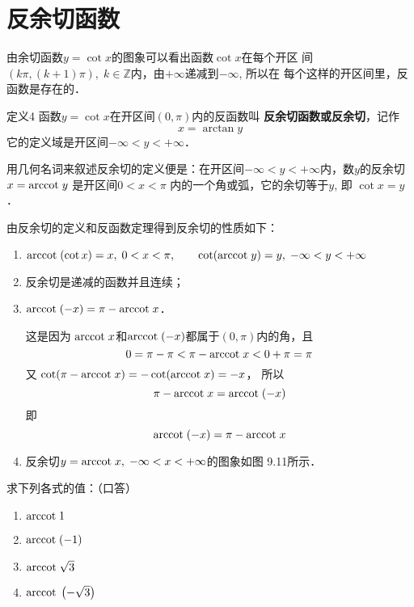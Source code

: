 \section{反余切函数}
由余切函数$y=\cot x$的图象可以看出函数$\cot x$在每个开区
间$(k\pi ,(k+1)\pi ),\; k\in\mathbb{Z}$内，由$+\infty$递减到$-\infty$, 所以在
每个这样的开区间里，反函数是存在的．

\begin{blk}{定义4}
     函数$y=\cot x$在开区间$(0,\pi )$内的反函数叫
\textbf{反余切函数或反余切}，记作
\[x=\arctan y\]
它的定义域是开区间$-\infty<y<+\infty$．
\end{blk}


用几何名词来叙述反余切的定义便是：在开区间$-\infty<y<+\infty$内，数$y$的反余切
$x={\rm arccot\; } y$
是开区间$0<x<\pi$ 内的一个角或弧，它的余切等于$y$, 即
$\cot x=y$．

由反余切的定义和反函数定理得到反余切的性质如下：
\begin{enumerate}
    \item ${\rm arccot\; } (\cot x)=x,\; 0<x<\pi ,\qquad 
\cot ({\rm arccot\; } y)=y,\; -\infty<y<+\infty$
\item 反余切是递减的函数并且连续；
\item ${\rm arccot\; } (-x)=\pi -{\rm arccot\; } x$．

这是因为
${\rm arccot\; } x$和${\rm arccot\; } (-x)$都属于$(0,\pi )$内的角，且
\[0=\pi -\pi <\pi - {\rm arccot\; } x<0+\pi =\pi \]
又
$\cot (\pi -{\rm arccot\; } x)=-\cot ({\rm arccot\; } x)=-x$，
所以
\[\pi -{\rm arccot\; } x={\rm arccot\; } (-x)\]
即
\[{\rm arccot\; } (-x)=\pi -{\rm arccot\; } x\]
\item 反余切$y={\rm arccot\; } x,\; -\infty<x<+\infty$的图象如图
9.11所示．
\end{enumerate}

\begin{figure}[htp]
    \centering
{}    
    \caption{}
\end{figure}



\begin{example}
    求下列各式的值：（口答）
\begin{multicols}{2}
\begin{enumerate}
    \item ${\rm arccot\; } 1$
    \item ${\rm arccot\; } (- 1)$
    \item ${\rm arccot\; } \sqrt{3}$
    \item ${\rm arccot\; } \left(-\sqrt{3}\right)$
\end{enumerate}
\end{multicols}
\end{example}

